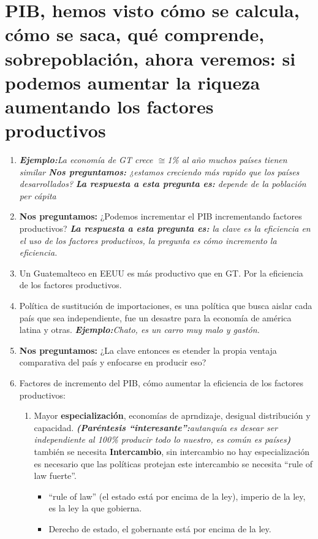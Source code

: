 \section{PIB, hemos visto cómo se calcula, cómo se saca, qué comprende, sobrepoblación, ahora veremos: si podemos aumentar la riqueza aumentando los factores productivos}
\begin{enumerate}
    \item \emph{\textbf{Ejemplo:}La economía de GT crece $\cong$1\% al año muchos países tienen similar \textbf{Nos preguntamos:} ¿estamos creciendo más rapido que los países desarrollados?} \emph{\textbf{La respuesta a esta pregunta es: }depende de la población per cápita}
    \item \textbf{Nos preguntamos:} ¿Podemos incrementar el PIB incrementando factores productivos? \emph{\textbf{La respuesta a esta pregunta es: }la clave es la eficiencia en el uso de los factores productivos, la pregunta es cómo incremento la eficiencia.}
    \item Un Guatemalteco en EEUU es más productivo que en GT. Por la eficiencia de los factores productivos.
    \item Política de sustitución de importaciones, es una política que busca aislar cada país que sea independiente, fue un desastre para la economía de américa latina y otras. \emph{\textbf{Ejemplo:}Chato, es un carro muy malo y gastón.}
    \item \textbf{Nos preguntamos:} ¿La clave entonces es etender la propia ventaja comparativa del país y enfocarse en producir eso? 
    \item Factores de incremento del PIB, cómo aumentar la eficiencia de los factores productivos:
    \begin{enumerate}
        \item Mayor \textbf{especialización}, economías de aprndizaje, desigual distribución y capacidad. \emph{\textbf{(Paréntesis ``interesante'':}autanquía es desear ser independiente al 100\% producir todo lo nuestro, es común es países\textbf{)}} también se necesita \textbf{Intercambio}, sin intercambio no hay especialización es necesario que las políticas protejan este intercambio se necesita ``rule of law fuerte''. 
        \begin{itemize}
            \item ``rule of law'' (el estado está por encima de la ley), imperio de la ley, es la ley la que gobierna.
            \item Derecho de estado, el gobernante está por encima de la ley.
        \end{itemize}
        

\end{enumerate}
\end{enumerate}
